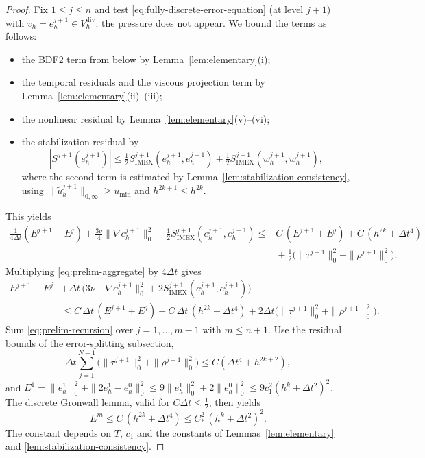 \documentclass[11pt]{article}
\theoremstyle{remark}\newtheorem{remark}{Remark}
\newcommand{\Vdivh}{V_h^{\mathrm{div}}}
\newcommand{\tu}{\tilde u_h}
\newcommand{\Simex}{S_{\mathrm{IMEX}}}
\theoremstyle{plain}
\newcommand{\new}[1]{{\color{blue}#1}}
\begin{document}
\begin{proof}
Fix $1\le j\le n$ and test \eqref{eq:fully-discrete-error-equation} (at level $j+1$) with $v_h=e_h^{j+1}\in\Vdivh$; the pressure does not appear. We bound the terms as follows:
\begin{itemize}[itemsep=1pt]
\item the BDF2 term from below by Lemma~\ref{lem:elementary}(i);
\item the temporal residuals and the viscous projection term by Lemma~\ref{lem:elementary}(ii)--(iii);
\item the nonlinear residual by Lemma~\ref{lem:elementary}(v)--(vi);
\item the stabilization residual by
\begin{equation}\label{eq:prelim-stab-split}
|S^{j+1}(e_h^{j+1})| \le \tfrac12 \Simex^{j+1}(e_h^{j+1},e_h^{j+1}) + \tfrac12 \Simex^{j+1}(w_h^{j+1},w_h^{j+1}),
\end{equation}
where the second term is estimated by Lemma~\ref{lem:stabilization-consistency}, using $\|\tu^{j+1}\|_{0,\infty}\ge u_{\min}$ \new{and $h^{2k+1}\le h^{2k}$}.
\end{itemize}
This yields
\begin{equation}\label{eq:prelim-aggregate}
\begin{aligned}
\frac{1}{4\Delta t}(E^{j+1}-E^j) + \frac{3\nu}{4}\|\nabla e_h^{j+1}\|_0^2+\frac12\Simex^{j+1}(e_h^{j+1},e_h^{j+1})
\le {}& C\,(E^{j+1}+E^j) + C\,(h^{2k}+\Delta t^4) \\
&{} + \tfrac12\big(\|\tau^{j+1}\|_0^2+\|\rho^{j+1}\|_0^2\big).
\end{aligned}
\end{equation}
Multiplying \eqref{eq:prelim-aggregate} by $4\Delta t$ gives
\begin{equation}\label{eq:prelim-recursion}
\begin{aligned}
E^{j+1}-E^j &+ \Delta t\,\bigl(3\nu\|\nabla e_h^{j+1}\|_0^2 + 2\Simex^{j+1}(e_h^{j+1},e_h^{j+1})\bigr)\\
&\le C\,\Delta t\,(E^{j+1}+E^j) + C\,\Delta t\,(h^{2k}+\Delta t^4)+2\Delta t\big(\|\tau^{j+1}\|_0^2+\|\rho^{j+1}\|_0^2\big).
\end{aligned}
\end{equation}
Sum \eqref{eq:prelim-recursion} over $j=1,\dots,m-1$ with $m\le n+1$. Use the residual bounds of the error-splitting subsection,
\[
\Delta t\sum_{j=1}^{N-1}\bigl(\|\tau^{j+1}\|_0^2+\|\rho^{j+1}\|_0^2\bigr)\le C(\Delta t^4+h^{2k+2}),
\]
and $E^1=\|e_h^1\|_0^2+\|2e_h^1-e_h^0\|_0^2\le 9\|e_h^1\|_0^2+2\|e_h^0\|_0^2\le 9c_1^2(h^k+\Delta t^2)^2$. The discrete Gronwall lemma, valid for $C\Delta t\le\frac12$, then yields
\[
E^m \le C\,(h^{2k}+\Delta t^4) \le C_*^2\,(h^k+\Delta t^2)^2 .
\]
The constant depends on $T$, $c_1$ and the constants of Lemmas~\ref{lem:elementary} and \ref{lem:stabilization-consistency}. 
\end{proof}
\end{document}
